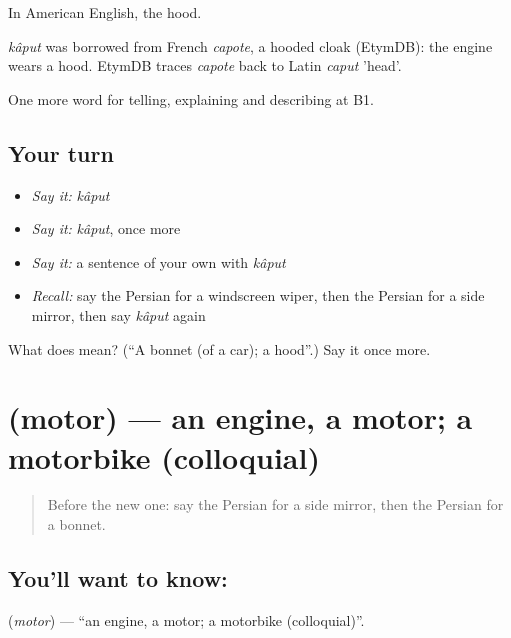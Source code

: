 In American English, the hood.

\begin{cousinweb}
\emph{kâput} was borrowed from French \emph{capote}, a hooded cloak (EtymDB): the engine wears a hood. EtymDB traces \emph{capote} back to Latin \emph{caput} 'head'.
\end{cousinweb}

\begin{grammarlens}[title={What you've built}]
One more word for telling, explaining and describing at B1.
\end{grammarlens}

\subsection*{Your turn}
\begin{itemize}
\raggedright
  \item \emph{Say it:} \emph{kâput}
  \item \emph{Say it:} \emph{kâput}, once more
  \item \emph{Say it:} a sentence of your own with \emph{kâput}
  \item \emph{Recall:} say the Persian for a windscreen wiper, then the Persian for a side mirror, then say \emph{kâput} again
\end{itemize}

\begin{tcolorbox}[breakable,colback=teal!4,colframe=teal!35!black,title={Before you move on}]
What does  mean? (\textquotedblleft{}A bonnet (of a car); a hood\textquotedblright{}.) Say it once more.
\end{tcolorbox}
\section[\texorpdfstring{\fa{موتور} (motor)}{موتور (motor)}]{ (motor) — an engine, a motor; a motorbike (colloquial)}

\label{lesson:FA-C422-motor}



\begin{quote}
Before the new one: say the Persian for a side mirror, then the Persian for a bonnet.
\end{quote}

\subsection*{You'll want to know: }
\textbf{} (\emph{motor}) — \textquotedblleft{}an engine, a motor; a motorbike (colloquial)\textquotedblright{}.

